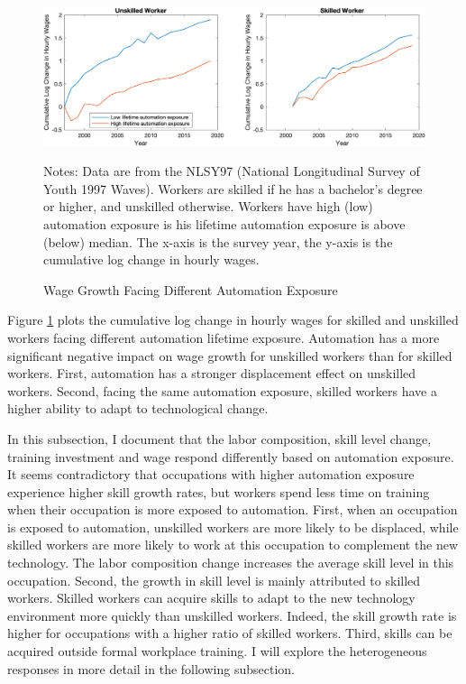 \documentclass[12pt]{article}
\begin{document}
\begin{figure}[h!]
\includegraphics[width = \textwidth]{wage_trend}
\caption{Wage Growth Facing Different Automation Exposure}
{\scriptsize Notes: Data are from the NLSY97 (National Longitudinal Survey of Youth 1997 Waves). Workers are skilled if he has a bachelor's degree or higher, and unskilled otherwise. Workers have high (low) automation exposure is his lifetime automation exposure is above (below) median. The x-axis is the survey year, the y-axis is the cumulative log change in hourly wages.}
\label{wage_trend}
\end{figure}

Figure \ref{wage_trend} plots the cumulative log change in hourly wages for skilled and unskilled workers facing different automation lifetime exposure. Automation has a more significant negative impact on wage growth for unskilled workers than for skilled workers. First, automation has a stronger displacement effect on unskilled workers. Second, facing the same automation exposure, skilled workers have a higher ability to adapt to technological change. 

In this subsection, I document that the labor composition, skill level change, training investment and wage respond differently based on automation exposure. It seems contradictory that occupations with higher automation exposure experience higher skill growth rates, but workers spend less time on training when their occupation is more exposed to automation. First, when an occupation is exposed to automation, unskilled workers are more likely to be displaced, while skilled workers are more likely to work at this occupation to complement the new technology. The labor composition change increases the average skill level in this occupation. Second, the growth in skill level is mainly attributed to skilled workers. Skilled workers can acquire skills to adapt to the new technology environment more quickly than unskilled workers. Indeed, the skill growth rate is higher for occupations with a higher ratio of skilled workers. Third, skills can be acquired outside formal workplace training. I will explore the heterogeneous responses in more detail in the following subsection. 
\end{document}
